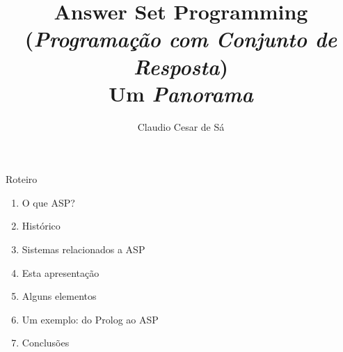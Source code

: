 \documentclass{beamer}
\title[Inteligência Artificial -- Otimização Combinatória] %
{Answer Set Programming \\ (\textit{Programação com Conjunto de Resposta})\\ Um \emph{Panorama}}
\author[Claudio Cesar de Sá] %
{Claudio Cesar de Sá\inst{1}}
\institute[UDESC]{Pesquisador Independente}
\date[\today] %
\begin{document}
\begin{frame}
  \titlepage
\end{frame}








\begin{frame}

\begin{block}{Roteiro}

\begin{enumerate}

  \item  O que ASP?
  \item  Histórico
  \item  Sistemas relacionados a ASP
  \item  Esta apresentação
  \item  Alguns elementos
  \item  Um exemplo: do Prolog ao ASP
  \item  Conclusões
  \end{enumerate}

\end{block}

\end{frame}
\end{document}
